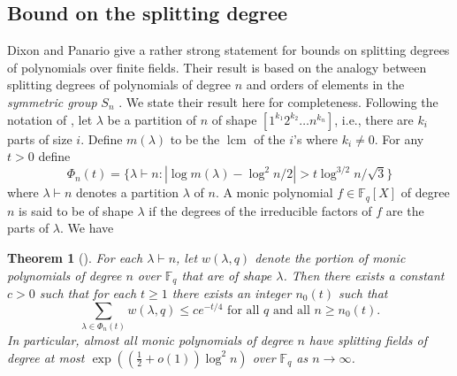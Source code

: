 \documentclass[11pt]{article}
\theoremstyle{plain}
\newtheorem{theorem}{Theorem}
\theoremstyle{definition}
\newcommand{\abs}[1]{\left\vert#1\right\vert}
\DeclareMathOperator{\lcm}{lcm} %
\def\F{\ensuremath{\mathbb{F}}}
\begin{document}
\begin{appendices}
	
\section{Bound on the splitting degree}
\label{sec:bound-splt}

Dixon and Panario \cite{dixon2004degree} give a rather strong statement for bounds on splitting 
degrees of polynomials over finite fields. Their result is based on the analogy between splitting 
degrees of polynomials of degree $n$ and orders of elements in the \textit{symmetric group} $S_n$ 
\cite{erdos1965some, erdos1967some}. We state their result here for completeness. Following the 
notation of \cite{dixon2004degree}, let $\lambda$ be a partition of $n$ of shape $[1^{k_1} 2^{k_2} 
\dots n^{k_n}]$, i.e., there are $k_i$ parts of size $i$. Define $m(\lambda)$ to be the $\lcm$ of 
the $i$'s where $k_i \ne 0$. For any $t > 0$ define 
\[ \Phi_n(t) = \{ \lambda \vdash n : \abs{\log m(\lambda) - \log^2n / 2} > t\log^{3/2}n / \sqrt{3} 
\} \]
where $\lambda \vdash n$ denotes a partition $\lambda$ of $n$. A monic polynomial $f \in \F_q[X]$ of 
degree $n$ is said to be of shape $\lambda$ if the degrees of the irreducible factors of $f$ are the 
parts of $\lambda$. We have
\begin{theorem}[{\cite[Theorem 1]{dixon2004degree}}]
	\label{thm:split-order}
	For each $\lambda \vdash n$, let $w(\lambda, q)$ denote the portion of monic polynomials of 
	degree $n$ over $\F_q$ that are of shape $\lambda$. Then there exists a constant $c > 0$ such 
	that for each $t \ge 1$ there exists an integer $n_0(t)$ such that 
	\[ \sum_{\lambda \in \Phi_n(t)} w(\lambda, q) \le ce^{-t / 4} \text{ for all } q \text{ and 
	all } n \ge n_0(t). \]
	In particular, almost all monic polynomials of degree $n$ have splitting fields of degree at 
	most $\exp((\frac{1}{2} + o(1))\log^2n)$ over $\F_q$ as $n \to \infty$.
\end{theorem}
	

\end{appendices}
\end{document}
